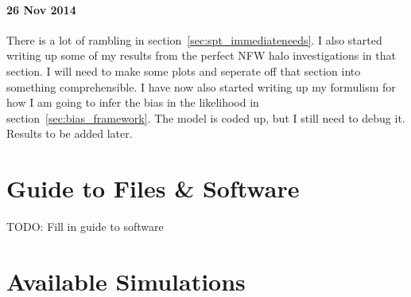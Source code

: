 \documentclass[11pt]{article}
\begin{document}
\paragraph{26 Nov 2014}
There is a lot of rambling in section~\ref{sec:spt_immediateneeds}. I also started writing up some of my results from the perfect NFW halo investigations in that section. I will need to make some plots and seperate off that section into something comprehensible. I have now also started writing up my formulism for how I am going to infer the bias in the likelihood in section~\ref{sec:bias_framework}. The model is coded up, but I still need to debug it. Results to be added later.


\clearpage \newpage


\section{Guide to Files \& Software}

TODO: Fill in guide to software



\clearpage \newpage


\section{Available Simulations}
\end{document}
